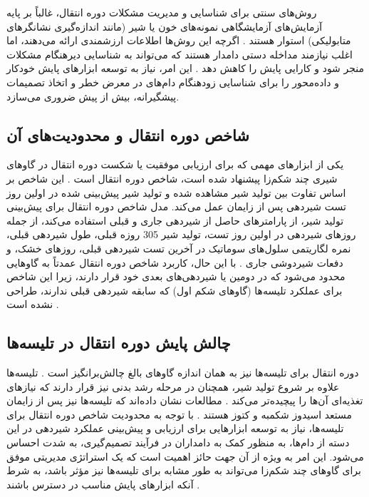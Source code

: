 روش‌های سنتی برای شناسایی و مدیریت مشکلات دوره انتقال، غالباً بر پایه آزمایش‌های آزمایشگاهی نمونه‌های خون یا شیر (مانند اندازه‌گیری نشانگرهای متابولیکی) استوار هستند \cite{DeKoster2019}. اگرچه این روش‌ها اطلاعات ارزشمندی ارائه می‌دهند، اما اغلب نیازمند مداخله دستی دامدار هستند که می‌تواند به شناسایی دیرهنگام مشکلات منجر شود و کارایی پایش را کاهش دهد \cite{Salamone2022}. این امر، نیاز به توسعه ابزارهای پایش خودکار و داده‌محور را برای شناسایی زودهنگام دام‌های در معرض خطر و اتخاذ تصمیمات پیشگیرانه، بیش از پیش ضروری می‌سازد.
	
\subsection{شاخص دوره انتقال  و محدودیت‌های آن}
یکی از ابزارهای مهمی که برای ارزیابی موفقیت یا شکست دوره انتقال در گاوهای شیری چند شکم‌زا پیشنهاد شده است، شاخص دوره انتقال است \cite{Nordlund2006}. این شاخص بر اساس تفاوت بین تولید شیر مشاهده شده و تولید شیر پیش‌بینی شده در اولین روز تست شیردهی پس از زایمان عمل می‌کند. مدل  شاخص دوره انتقال برای پیش‌بینی تولید شیر، از پارامترهای حاصل از شیردهی جاری و قبلی استفاده می‌کند، از جمله روزهای شیردهی در اولین روز تست، تولید شیر 305	روزه قبلی، طول شیردهی قبلی، نمره لگاریتمی سلول‌های سوماتیک در آخرین تست شیردهی قبلی، روزهای خشک، و دفعات شیردوشی جاری \cite{Nordlund2006}. با این حال، کاربرد شاخص دوره انتقال عمدتاً به گاوهایی محدود می‌شود که در دومین یا شیردهی‌های بعدی خود قرار دارند، زیرا این شاخص برای عملکرد تلیسه‌ها (گاوهای شکم اول) که سابقه شیردهی قبلی ندارند، طراحی نشده است \cite{Dallago2019}.
	
\subsection{چالش پایش دوره انتقال در تلیسه‌ها}	
دوره انتقال برای تلیسه‌ها نیز به همان اندازه گاوهای بالغ چالش‌برانگیز است \cite{Dallago2019}. تلیسه‌ها علاوه بر شروع تولید شیر، همچنان در مرحله رشد بدنی نیز قرار دارند که نیازهای تغذیه‌ای آن‌ها را پیچیده‌تر می‌کند \cite{Dallago2019}. مطالعات نشان داده‌اند که تلیسه‌ها نیز پس از زایمان مستعد اسیدوز شکمبه و کتوز هستند \cite{Dallago2019}. با توجه به محدودیت شاخص دوره انتقال برای تلیسه‌ها، نیاز به توسعه ابزارهایی برای ارزیابی و پیش‌بینی عملکرد شیردهی در این دسته از دام‌ها، به منظور کمک به دامداران در فرآیند تصمیم‌گیری، به شدت احساس می‌شود. این امر به ویژه از آن جهت حائز اهمیت است که یک استراتژی مدیریتی موفق برای گاوهای چند شکم‌زا می‌تواند به طور مشابه برای تلیسه‌ها نیز مؤثر باشد، به شرط آنکه ابزارهای پایش مناسب در دسترس باشند \cite{Dallago2019}.
	
